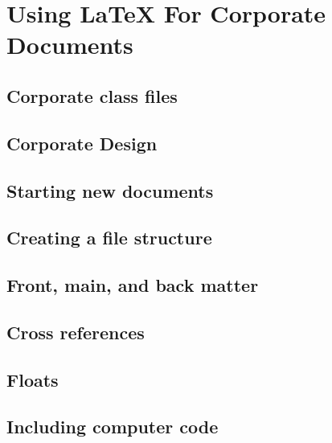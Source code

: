 \chapter{Using LaTeX For Corporate Documents }


\section{Corporate class files}\label{sec:Corporatecls}


\section{Corporate Design}\label{sec:CorporateDesign}


\section{Starting new documents}\label{sec:NewDocs}


\section{Creating a file structure}\label{sec:FileStructure}


\section{Front, main, and back matter}


\section{Cross references}


\section{Floats}


\section{Including computer code}\label{Sec:Codes}



